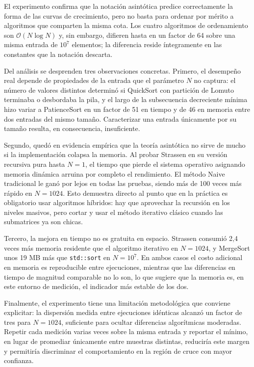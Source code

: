 El experimento confirma que la notación asintótica predice correctamente la forma de las curvas de crecimiento, pero no basta para ordenar por mérito a algoritmos que comparten la misma cota. Los cuatro algoritmos de ordenamiento son $\mathcal{O}(N \log N)$ y, sin embargo, difieren hasta en un factor de 64 sobre una misma entrada de $10^{7}$ elementos; la diferencia reside íntegramente en las constantes que la notación descarta.

Del análisis se desprenden tres observaciones concretas. Primero, el desempeño real depende de propiedades de la entrada que el parámetro $N$ no captura: el número de valores distintos determinó si QuickSort con partición de Lomuto terminaba o desbordaba la pila, y el largo de la subsecuencia decreciente mínima hizo variar a PatienceSort en un factor de 51 en tiempo y de 46 en memoria entre dos entradas del mismo tamaño. Caracterizar una entrada únicamente por su tamaño resulta, en consecuencia, insuficiente.

Segundo, quedó en evidencia empírica que la teoría asintótica no sirve de mucho si la implementación colapsa la memoria. Al probar Strassen en su versión recursiva pura hasta $N=1$, el tiempo que pierde el sistema operativo asignando memoria dinámica arruina por completo el rendimiento. El método Naive tradicional le ganó por lejos en todas las pruebas, siendo más de 100 veces más rápido en $N=1024$. Esto demuestra directo al punto que en la práctica es obligatorio usar algoritmos híbridos: hay que aprovechar la recursión en los niveles masivos, pero cortar y usar el método iterativo clásico cuando las submatrices ya son chicas.

Tercero, la mejora en tiempo no es gratuita en espacio. Strassen consumió 2{,}4 veces más memoria residente que el algoritmo iterativo en $N = 1024$, y MergeSort unos 19 MB más que \texttt{std::sort} en $N = 10^{7}$. En ambos casos el costo adicional en memoria es reproducible entre ejecuciones, mientras que las diferencias en tiempo de magnitud comparable no lo son, lo que sugiere que la memoria es, en este entorno de medición, el indicador más estable de los dos.

Finalmente, el experimento tiene una limitación metodológica que conviene explicitar: la dispersión medida entre ejecuciones idénticas alcanzó un factor de tres para $N = 1024$, suficiente para ocultar diferencias algorítmicas moderadas. Repetir cada medición varias veces sobre la misma entrada y reportar el mínimo, en lugar de promediar únicamente entre muestras distintas, reduciría este margen y permitiría discriminar el comportamiento en la región de cruce con mayor confianza.
